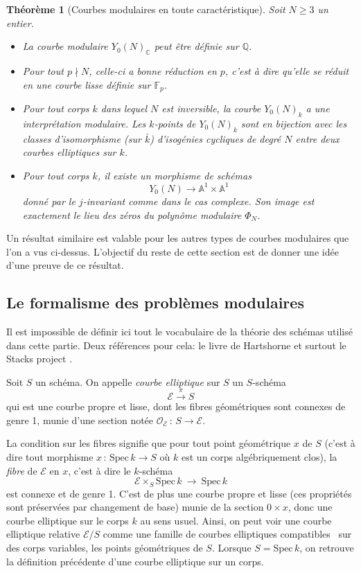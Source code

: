 \documentclass[11pt,a4paper]{article}
\newcommand{\C}{\mathbb{C}}
\newcommand{\A}{\mathbb{A}}
\newcommand{\F}{\mathbb{F}}
\newcommand{\Q}{\mathbb{Q}}
\newcommand{\E}{\mathcal{E}}
\renewcommand{\O}{\mathcal{O}}
\newcommand{\vers}{\longrightarrow}
\newcommand{\Spec}{\mathrm{Spec}\,}
\newcommand{\de}{\,:\,}
\newtheorem*{thm}{Théorème}
\theoremstyle{definition}
\begin{document}
\begin{thm}[Courbes modulaires en toute caractéristique] Soit $N\geq 3$ un entier.

\begin{itemize}

\item[(i)] La courbe modulaire $Y_0(N)_\C$ peut être définie sur $\Q$.
\item[(ii)] Pour tout $p \nmid N$, celle-ci a bonne réduction en $p$, c'est à dire qu'elle se réduit en une courbe lisse définie sur $\F_p$.
\item[(iii)] Pour tout corps $k$ dans lequel $N$ est inversible, la courbe $Y_0(N)_k$ a une interprétation modulaire. Les $k$-points de $Y_0(N)_k$ sont en bijection avec les classes d'isomorphisme (sur $\bar{k}$) d'isogénies cycliques de degré $N$ entre deux courbes elliptiques sur $k$.
\item[(iv)] Pour tout corps $k$, il existe un morphisme de schémas
$$Y_0(N) \vers \A^1\times \A^1$$
donné par le $j$-invariant comme dans le cas complexe. Son image est exactement le lieu des zéros du polynôme modulaire $\Phi_N$.

\end{itemize}

\end{thm}

Un résultat similaire est valable pour les autres types de courbes modulaires que l'on a vus ci-dessus. L'objectif du reste de cette section est de donner une idée d'une preuve de ce résultat. 


\subsection{Le formalisme des problèmes modulaires}


Il est impossible de définir ici tout le vocabulaire de la théorie des schémas utilisé dans cette partie. Deux références pour cela: le livre de Hartshorne \cite{Hart} et surtout le Stacks project \cite{Stack}.


Soit $S$ un schéma. On appelle \emph{courbe elliptique} sur $S$ un $S$-schéma
$$\E \overset{\pi}{\vers} S$$
qui est une courbe propre et lisse, dont les fibres géométriques sont connexes de genre 1, munie d'une section notée $\O_\E\de S\vers \E$.
 
La condition sur les fibres signifie que pour tout point géométrique $x$ de $S$ (c'est à dire tout morphisme $x\de\Spec k\vers S$ où $k$ est un corps algébriquement clos), la \emph{fibre} de $\E$ en $x$, c'est à dire le $k$-schéma
$$\E \times_S \Spec k\ \vers\ \Spec k$$
est connexe et de genre 1. C'est de plus une courbe propre et lisse (ces propriétés sont préservées par changement de base) munie de la section $0 \times x$, donc une courbe elliptique sur le corps $k$ au sens usuel. Ainsi, on peut voir une courbe elliptique relative $\E/S$ comme une famille de courbes elliptiques \og compatibles \fg\ sur des corps variables, les points géométriques de $S$. Lorsque $S = \Spec k$, on retrouve la définition précédente d'une courbe elliptique sur un corps.
\end{document}
